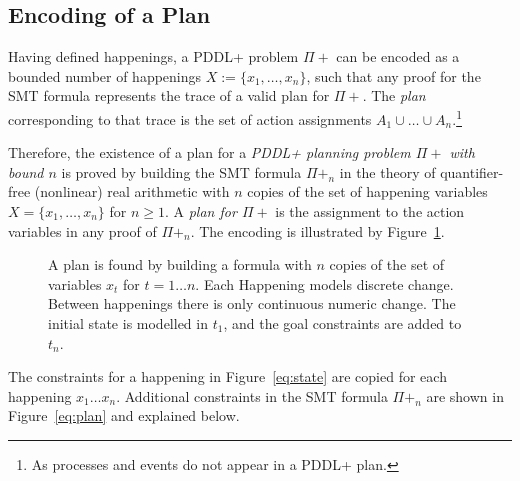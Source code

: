 \subsection{Encoding of a Plan}\label{sec:enc_problem}

Having defined happenings, a PDDL+ problem $\Pi+$ can be encoded as a bounded number of happenings $X:=\{x_1,\ldots,x_n\}$, such that any proof for the SMT formula represents the trace of a valid plan for $\Pi+$. The \textit{plan} corresponding to that trace is the set of action assignments $A_1\cup \ldots\cup A_n$.\footnote{As processes and events do not appear in a PDDL+ plan.}

Therefore, the existence of a plan for a  {\sl PDDL+ planning problem $\Pi+$ with bound $n$} is proved by building the SMT formula $\Pi+_n$ in the theory of quantifier-free (nonlinear) real arithmetic with $n$ copies of the set of happening variables $X = \{x_1,\ldots,x_n\}$ for $n \geq 1$. A \textit{plan for $\Pi+$} is the assignment to the action variables in any proof of $\Pi+_n$. The encoding is illustrated by Figure~\ref{fig:plan}.

\begin{figure}[thb]
\center

\caption{A plan is found by building a formula with $n$ copies of the set of variables $x_t$ for $t = 1 \ldots n$. Each Happening models discrete change. Between happenings there is only continuous numeric change. The initial state is modelled in $t_1$, and the goal constraints are added to $t_n$.}
\label{fig:plan}
\end{figure}

\noindent The constraints for a happening in Figure~\ref{eq:state} are copied for each happening $x_1 \ldots x_n$. Additional constraints in the SMT formula $\Pi+_n$ are shown in Figure~\ref{eq:plan} and explained below.

